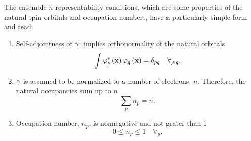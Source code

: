 The ensemble $n$-representability conditions, which are some properties of the 
natural spin-orbitals and occupation numbers, have a particularly simple 
form and read:
\begin{enumerate}
    \item Self-adjointness of $\gamma$: implies orthonormality of the natural orbitals 
        \begin{equation} \label{ec:self-adjoint-condition}
            \int
            \varphi_p^{*} \left( \boldsymbol{\mathrm{x}} \right)
            \varphi_q \left( \boldsymbol{\mathrm{x}} \right)
            = \delta_{pq}
            \quad \forall_{p,q} 
            .
        \end{equation}
        
    \item $\gamma$ is assumed to be normalized to a number of electrons, $n$.
        Therefore, the natural occupancies sum up to $n$  
        \begin{equation} \label{ec:normalization-condition}
            \sum_{p} n_p = n
            .
        \end{equation}

    \item Occupation number, $n_p$, is nonnegative and not grater than 1 
    \begin{equation} \label{ec:occ-number-condition}
        0 \leq n_p \leq 1 \quad \forall_{p}
        .
    \end{equation}
\end{enumerate}

